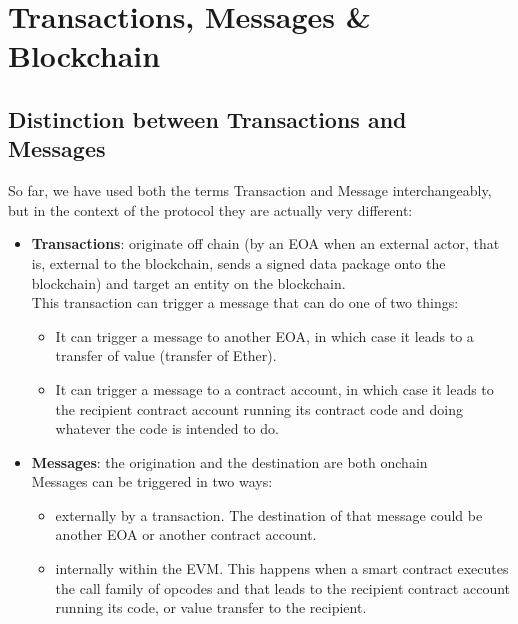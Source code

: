 \section{Transactions, Messages \&
Blockchain}\label{transactions-messages-blockchain}

\subsection{Distinction between Transactions and
Messages}\label{distinction-between-transactions-and-messages}

So far, we have used both the terms Transaction and Message
interchangeably, but in the context of the protocol they are actually
very different:

\begin{itemize}
\item
  \textbf{Transactions}: originate off chain (by an EOA when an external
  actor, that is, external to the blockchain, sends a signed data
  package onto the blockchain) and target an entity on the blockchain.\\

  This transaction can trigger a message that can do one of two things:

  \begin{itemize}
  \tightlist
  \item
    It can trigger a message to another EOA, in which case it leads to a
    transfer of value (transfer of Ether).
  \item
    It can trigger a message to a contract account, in which case it
    leads to the recipient contract account running its contract code
    and doing whatever the code is intended to do.
  \end{itemize}
\item
  \textbf{Messages}: the origination and the destination are both
  onchain\\

  Messages can be triggered in two ways:

  \begin{itemize}
  \tightlist
  \item
    externally by a transaction. The destination of that message could
    be another EOA or another contract account.
  \item
    internally within the EVM. This happens when a smart contract
    executes the call family of opcodes and that leads to the recipient
    contract account running its code, or value transfer to the
    recipient.
  \end{itemize}
\end{itemize}

